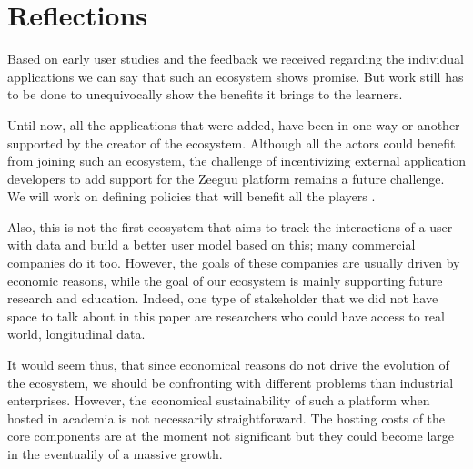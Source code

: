 
\section {Reflections}

Based on early user studies and the feedback we received 
regarding the individual applications we can say that such
an ecosystem shows promise. But work still has to 
be done to unequivocally show the benefits it brings 
to the learners. 

Until now, all the applications that were added, have been in one way or another supported by the creator of the ecosystem. Although all the actors could benefit from joining such an ecosystem,  the challenge of incentivizing external application developers to add support for the Zeeguu platform remains a future challenge. We will work on defining policies that will benefit all the players \cite{Jans09agenda}. 


Also, this is not the first ecosystem that aims to track 
the interactions of a user with data and build a better 
user model based on this; many commercial companies do it too. 
However, the goals of these companies are usually driven by economic reasons, 
while the goal of our ecosystem is mainly supporting future research and education. Indeed, one type of stakeholder that we did not have space to talk about in this paper are researchers who could have access to real world, longitudinal data.

It would seem thus, that since economical reasons do not drive the evolution of the ecosystem, we should be confronting with different problems than industrial enterprises. However, the economical 
sustainability of such a platform when hosted in academia
is not necessarily straightforward. The hosting costs of the 
core components are at the moment not significant 
but they could become large in the eventualily of 
a massive growth. 








